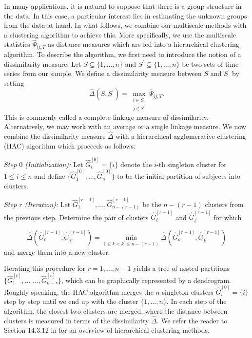 In many applications, it is natural to suppose that there is a group structure in the data. In this case, a particular interest lies in estimating the unknown groups from the data at hand. In what follows, we combine our multiscale methods with a clustering algorithm to achieve this. More specifically, we use the multiscale statistics $\widehat{\Psi}_{ij,T}$ as distance measures which are fed into a hierarchical clustering algorithm. To describe the algorithm, we first need to introduce the notion of a dissimilarity measure: Let $S \subseteq \{1,\ldots,n\}$ and $S^\prime \subseteq \{1,\ldots,n\}$ be two sets of time series from our sample. We define a dissimilarity measure between $S$ and $S^\prime$ by setting 
\begin{equation}\label{dissimilarity}
\widehat{\Delta}(S,S^\prime) = \max_{\substack{i \in S, \\ j \in S^\prime}} \widehat{\Psi}_{ij,T}. 
\end{equation}
This is commonly called a complete linkage measure of dissimilarity. Alternatively, we may work with an average or a single linkage measure. We now combine the dissimilarity measure $\widehat{\Delta}$ with a hierarchical agglomerative clustering (HAC) algorithm which proceeds as follows: 
\vspace{10pt}

\noindent \textit{Step $0$ (Initialization):} Let $\widehat{G}_i^{[0]} = \{ i \}$ denote the $i$-th singleton cluster for $1 \le i \le n$ and define $\{\widehat{G}_1^{[0]},\ldots,\widehat{G}_n^{[0]} \}$ to be the initial partition of subjects into clusters. 
\vspace{5pt}

\noindent \textit{Step $r$ (Iteration):} Let $\widehat{G}_1^{[r-1]},\ldots,\widehat{G}_{n-(r-1)}^{[r-1]}$ be the $n-(r-1)$ clusters from the previous step. Determine the pair of clusters $\widehat{G}_{\ell}^{[r-1]}$ and $\widehat{G}_{{\ell}^\prime}^{[r-1]}$ for which 

\[ \widehat{\Delta}(\widehat{G}_{\ell}^{[r-1]},\widehat{G}_{{\ell}^\prime}^{[r-1]}) = \min_{1 \le k < k^\prime \le n-(r-1)} \widehat{\Delta}(\widehat{G}_{k}^{[r-1]},\widehat{G}_{k^\prime}^{[r-1]}) \]  
and merge them into a new cluster. 
\vspace{10pt}

\noindent Iterating this procedure for $r = 1,\ldots,n-1$ yields a tree of nested partitions $\{\widehat{G}_1^{[r]},\ldots$ $\ldots,\widehat{G}_{n-r}^{[r]}\}$, which can be graphically represented by a dendrogram. Roughly speaking, the HAC algorithm merges the $n$ singleton clusters $\widehat{G}_i^{[0]} = \{ i \}$ step by step until we end up with the cluster $\{1,\ldots,n\}$. In each step of the algorithm, the closest two clusters are merged, where the distance between clusters is measured in terms of the dissimilarity $\widehat{\Delta}$. We refer the reader to Section 14.3.12 in \cite{HastieTibshiraniFriedman2009} for an overview of hierarchical clustering methods. 


